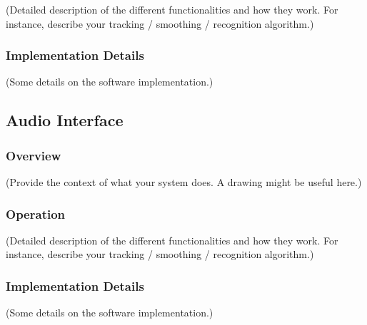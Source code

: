 (Detailed description of the different functionalities and how they work. For
instance, describe your tracking / smoothing / recognition algorithm.)

\subsubsection{Implementation Details}
\label{sec:pbs-impl}

(Some details on the software implementation.)

\subsection{Audio Interface}
\label{sec:audio}

\subsubsection{Overview}
\label{sec:audio-overview}

(Provide the context of what your system does. A drawing might be useful here.)

\subsubsection{Operation}
\label{sec:audio-op}

(Detailed description of the different functionalities and how they work. For
instance, describe your tracking / smoothing / recognition algorithm.)

\subsubsection{Implementation Details}
\label{sec:audio-impl}

(Some details on the software implementation.)
